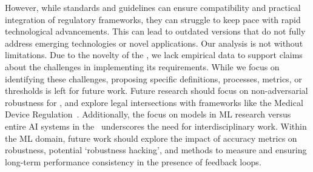 However, while standards and guidelines can ensure compatibility and practical integration of regulatory frameworks, they can struggle to keep pace with rapid technological advancements. 
%
This can lead to outdated versions that do not fully address emerging technologies or novel applications.
% 
Our analysis is not without limitations. Due to the novelty of the \EUAIAct, we lack empirical data to support claims about the challenges in implementing its requirements. While we focus on identifying these challenges, proposing specific definitions, processes, metrics, or thresholds is left for future work.
%
Future research should focus on non-adversarial robustness for \GPAIMSSR, and explore legal intersections with frameworks like the Medical Device Regulation~\cite{biasin2023new, nolte2024new}. Additionally, the focus on models in ML research versus entire AI systems in the \EUAIAct\ underscores the need for interdisciplinary work. Within the ML domain, future work should explore the impact of accuracy metrics on robustness, potential `robustness hacking', and methods to measure and ensuring long-term performance consistency in the presence of feedback loops.

